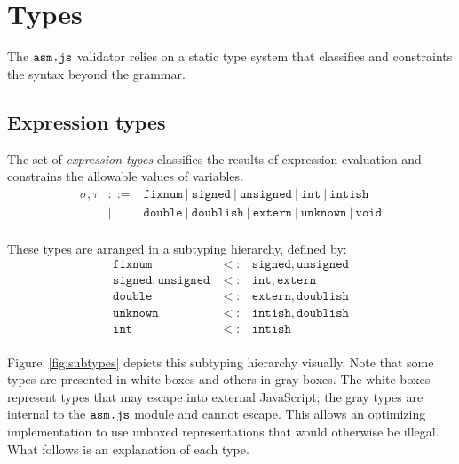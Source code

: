 \documentclass{article}
\newcommand{\mathjs}[1]{\mbox{\texttt{{#1}}}}
\newcommand{\bit}{\mathtt{bit}}
\newcommand{\unsigned}{\mathtt{unsigned}}
\newcommand{\signed}{\mathtt{signed}}
\newcommand{\fixnum}{\mathtt{fixnum}}
\newcommand{\double}{\mathtt{double}}
\newcommand{\extern}{\mathtt{extern}}
\newcommand{\unk}{\mathtt{unknown}}
\newcommand{\void}{\mathtt{void}}
\renewcommand{\int}{\mathtt{int}}
\newcommand{\boolish}{\mathtt{boolish}}
\newcommand{\intish}{\mathtt{intish}}
\newcommand{\doublish}{\mathtt{doublish}}
\begin{document}
\section{Types}
\label{sec:types}

The $\mathjs{asm.js}$ validator relies on a static type system that
classifies and constraints the syntax beyond the grammar.

\subsection{Expression types}

The set of {\it expression types} classifies the results of expression
evaluation and constrains the allowable values of variables.
\[
\begin{array}{rcl}
\sigma, \tau & ::= & \fixnum ~|~ \signed ~|~ \unsigned ~|~ \int ~|~ \intish \\
             &  |  & \double ~|~ \doublish ~|~ \extern ~|~ \unk ~|~ \void \\
\end{array}
\]

These types are arranged in a subtyping hierarchy, defined by:
\[
\begin{array}{rcl}
\fixnum            & <: & \signed, \unsigned \\
\signed, \unsigned & <: & \int, \extern \\
\double            & <: & \extern, \doublish \\
\unk               & <: & \intish, \doublish \\
\int               & <: & \intish \\
\end{array}
\]

Figure~\ref{fig:subtypes} depicts this subtyping hierarchy
visually. Note that some types are presented in white boxes and others
in gray boxes. The white boxes represent types that may escape into
external JavaScript; the gray types are internal to the
$\mathjs{asm.js}$ module and cannot escape. This allows an optimizing
implementation to use unboxed representations that would otherwise be
illegal. What follows is an explanation of each type.
\end{document}
